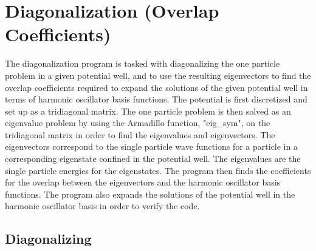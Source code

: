 \documentclass[../main.tex]{subfiles}
\begin{document}
\section{Diagonalization (Overlap Coefficients)}

The diagonalization program is tasked with diagonalizing the one particle problem in a given potential well, and to use the resulting eigenvectors to find the overlap coefficients required to expand the solutions of the given potential well in terms of harmonic oscillator basis functions. The potential is first discretized and set up as a tridiagonal matrix. The one particle problem is then solved as an eigenvalue problem by using the Armadillo\cite{Armadillo} function, "eig\_sym", on the tridiagonal matrix in order to find the eigenvalues and eigenvectors. The eigenvectors correspond to the single particle wave functions for a particle in a corresponding eigenstate confined in the potential well. The eigenvalues are the single particle energies for the eigenstates. The program then finds the coefficients for the overlap between the eigenvectors and the harmonic oscillator basis functions. The program also expands the solutions of the potential well in the harmonic oscillator basis in order to verify the code.

\subsection{Diagonalizing}
\end{document}
